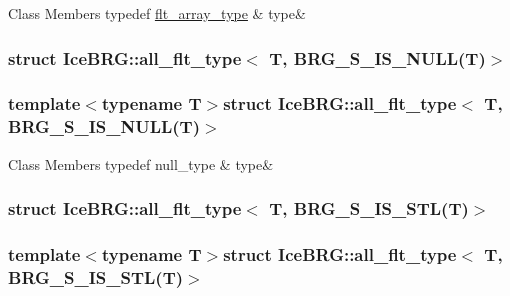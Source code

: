 \begin{DoxyFields}{Class Members}
\hypertarget{namespaceIceBRG_ad7569124fa0af4d32611dc8308ec4292}{}typedef \hyperlink{namespaceIceBRG_acdca5c05302480eba6ba053449643a6d}{flt\+\_\+array\+\_\+type}\label{namespaceIceBRG_ad7569124fa0af4d32611dc8308ec4292}
&
type&
\\
\hline

\end{DoxyFields}
\label{structIceBRG_1_1all__flt__type_3_01T_00_01BRG__S__IS__NULL_07T_08_4}
\hypertarget{namespaceIceBRG_structIceBRG_1_1all__flt__type_3_01T_00_01BRG__S__IS__NULL_07T_08_4}{}
\subsubsection{struct Ice\+B\+R\+G\+:\+:all\+\_\+flt\+\_\+type$<$ T, B\+R\+G\+\_\+\+S\+\_\+\+I\+S\+\_\+\+N\+U\+L\+L(T)$>$}
\subsubsection*{template$<$typename T$>$struct Ice\+B\+R\+G\+::all\+\_\+flt\+\_\+type$<$ T, B\+R\+G\+\_\+\+S\+\_\+\+I\+S\+\_\+\+N\+U\+L\+L(\+T)$>$}

\begin{DoxyFields}{Class Members}
\hypertarget{namespaceIceBRG_a86edd19bd063589fa210e249e59c816e}{}typedef null\+\_\+type\label{namespaceIceBRG_a86edd19bd063589fa210e249e59c816e}
&
type&
\\
\hline

\end{DoxyFields}
\label{structIceBRG_1_1all__flt__type_3_01T_00_01BRG__S__IS__STL_07T_08_4}
\hypertarget{namespaceIceBRG_structIceBRG_1_1all__flt__type_3_01T_00_01BRG__S__IS__STL_07T_08_4}{}
\subsubsection{struct Ice\+B\+R\+G\+:\+:all\+\_\+flt\+\_\+type$<$ T, B\+R\+G\+\_\+\+S\+\_\+\+I\+S\+\_\+\+S\+T\+L(T)$>$}
\subsubsection*{template$<$typename T$>$struct Ice\+B\+R\+G\+::all\+\_\+flt\+\_\+type$<$ T, B\+R\+G\+\_\+\+S\+\_\+\+I\+S\+\_\+\+S\+T\+L(\+T)$>$}

